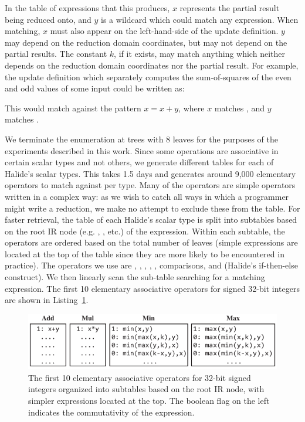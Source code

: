 In the table of expressions that this produces, $x$ represents the partial result being reduced onto, and $y$ is a wildcard which could match any expression. When matching, $x$ must also appear on the left-hand-side of the update definition. $y$ may depend on the reduction domain coordinates, but may not depend on the partial results. The constant $k$, if it exists, may match anything which neither depends on the reduction domain coordinates nor the partial result. For example, the update definition which separately computes the sum-of-squares of the even and odd values of some input  could be written as:


\noindent This would match against the pattern $x = x + y$, where $x$ matches , and $y$ matches .

We terminate the enumeration at trees with 8 leaves for the purposes of the experiments described in this work. Since some operations are associative in certain scalar types and not others, we generate different tables for each of Halide's scalar types.  This takes 1.5 days and generates around 9,000 elementary operators to match against per type. Many of the operators are simple operators written in a complex way: as we wish to catch all ways in which a programmer might write a reduction, we make no attempt to exclude these from the table. For faster retrieval, the table of each Halide's scalar type is split into subtables based on the root IR node (e.g. , , etc.) of the expression. Within each subtable, the operators are ordered based on the total number of leaves (simple expressions are located at the top of the table since they are more likely to be encountered in practice). The operators we use are , , , , , comparisons, and  (Halide’s if-then-else construct). We then linearly scan the sub-table searching for a matching expression. The first 10 elementary associative operators for signed 32-bit integers are shown in Listing~\ref{fig:top10}.

\begin{figure}
\centering
\includegraphics[width=\columnwidth]{tables}
\caption{The first 10 elementary associative operators for 32-bit signed integers organized into subtables based on the root IR node, with simpler expressions located at the top. The boolean flag on the left indicates the commutativity of the expression.}
\label{fig:top10}
\end{figure}


